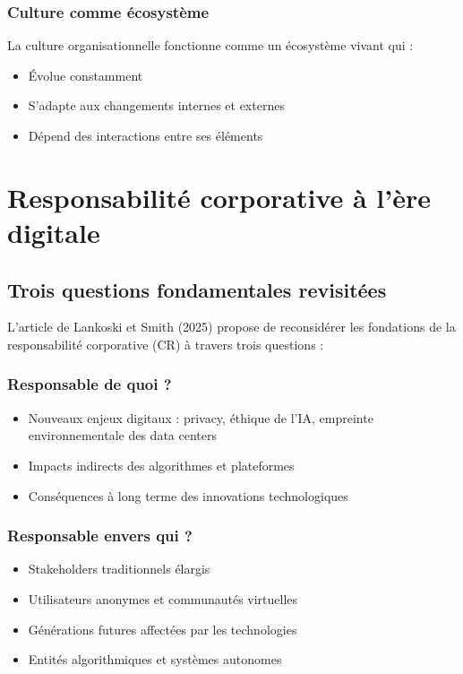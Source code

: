 \documentclass[12pt,a4paper]{article}
\begin{document}
\subsubsection{Culture comme écosystème}
La culture organisationnelle fonctionne comme un écosystème vivant qui :
\begin{itemize}
    \item Évolue constamment
    \item S'adapte aux changements internes et externes
    \item Dépend des interactions entre ses éléments
\end{itemize}

\section{Responsabilité corporative à l'ère digitale}

\subsection{Trois questions fondamentales revisitées}

L'article de Lankoski et Smith (2025) propose de reconsidérer les fondations de la responsabilité corporative (CR) à travers trois questions :

\subsubsection{Responsable de quoi ?}
\begin{itemize}
    \item Nouveaux enjeux digitaux : privacy, éthique de l'IA, empreinte environnementale des data centers
    \item Impacts indirects des algorithmes et plateformes
    \item Conséquences à long terme des innovations technologiques
\end{itemize}

\subsubsection{Responsable envers qui ?}
\begin{itemize}
    \item Stakeholders traditionnels élargis
    \item Utilisateurs anonymes et communautés virtuelles
    \item Générations futures affectées par les technologies
    \item Entités algorithmiques et systèmes autonomes
\end{itemize}
\end{document}
